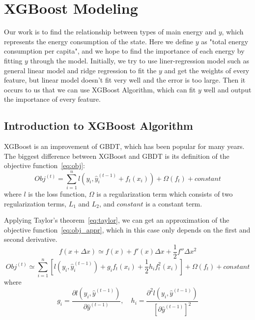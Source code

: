\documentclass{mcmthesis}
\begin{document}
\section{XGBoost Modeling}
Our work is to find the relationship between types of main energy and $y$, which represents the energy consumption of the state.
Here we define $y$ as "total energy consumption per capita", and we hope to find the importance of each energy by fitting $y$ through the model.
Initially, we try to use liner-regression model such as general linear model and ridge regression to fit the $y$ and get the weights of every feature, but linear model doesn’t fit very well and the error is too large.
Then it occurs to us that we can use XGBoost Algorithm, which can fit $y$ well and output the importance of every feature.

\subsection{Introduction to XGBoost Algorithm}
XGBoost is an improvement of GBDT, which has been popular for many years.
The biggest difference between XGBoost and GBDT is its definition of the objective function~\eqref{eq:obj}:
\begin{equation}  \label{eq:obj}
Obj^{(t)} = \sum_{i=1}^{n} l\left( y_i, \hat{y}_i^{(t-1)} + f_t(x_i)\right) + \Omega (f_t) + constant
\end{equation}
where $l$ is the loss function, $\Omega$ is a regularization term which consists of two regularization terms, $L_1$ and $L_2$, and $constant$ is a constant term.

Applying Taylor's theorem~\eqref{eq:taylor}, we can get an approximation of the objective function~\eqref{eq:obj_appr}, which in this case only depends on the first and second derivative.
\begin{equation}  \label{eq:taylor}
f(x + \Delta x) \simeq f(x) + f'(x) \Delta x + \frac{1}{2} f''\Delta x^2
\end{equation} 
\begin{equation}  \label{eq:obj_appr}
Obj^{(t)} \simeq \sum_{i=1}^{n} \left[ l\left(y_i, \hat{y}_i^{(t-1)}\right) + g_i f_t\left(x_i\right) + \frac{1}{2} h_i f_t^2\left(x_i\right)\right] + \Omega (f_t) + constant
\end{equation}
where
\begin{equation}
g_i = \frac{\partial l(y_i, \hat{y}^{(t-1)})}{\partial \hat{y}^{(t-1)}},\quad h_i = \frac{\partial^2 l(y_i, \hat{y}^{(t-1)})}{{\left[\partial \hat{y}^{(t-1)}\right]}^2}
\end{equation}
\end{document}
